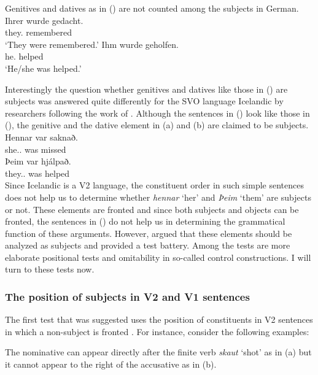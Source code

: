 Genitives and datives as in () are not counted among the subjects in German.
\eal
\ex 
\gll Ihrer       wurde gedacht.\\
     they.\GEN{} \AUX{} remembered\\\german
\glt `They were remembered.'
\ex 
\gll Ihm       wurde  geholfen.\\
     he.\DAT{} \AUX{} helped\\
\glt `He/she was helped.'
\zl

Interestingly the question whether genitives and datives like those in () are subjects was
answered quite differently for the SVO language Icelandic by researchers following the work of
\citet*{ZMT85a}. Although the sentences in () look like those in (), the genitive and
the dative element in (a) and (b) are claimed to be subjects.
\eal
\label{ex-subject-icelandic-passive-v2}
\ex 
\gll Hennar var saknað.\\
     she.\SG.\GEN{} was missed\\\icelandic
\ex 
\gll Þeim            var hjálpað.\\
     they.\PL.\DAT{} was helped\\
\zl
Since Icelandic is a V2 language, the constituent order in such simple sentences does not help us to
determine whether \emph{hennar} `her' and \emph{Þeim} `them' are subjects or not. These elements are
fronted and since both subjects and objects can be fronted, the sentences in () do not help
us in determining the grammatical function of these arguments. However, \citet*{ZMT85a} argued that
these elements should be analyzed as subjects and provided a test battery. Among the tests are more
elaborate positional tests and omitability in so-called control constructions. I will turn to these
tests now.


\subsubsection{The position of subjects in V2 and V1 sentences}


The first test that was suggested uses the position of constituents in V2 sentences in which a
non-subject is fronted \citep*[Section~2.3]{ZMT85a}. For instance, consider the following examples:

\eal
\zl
The nominative can appear directly after the finite verb \emph{skaut} `shot' as in (a) but it
cannot appear to the right of the accusative as in (b).

